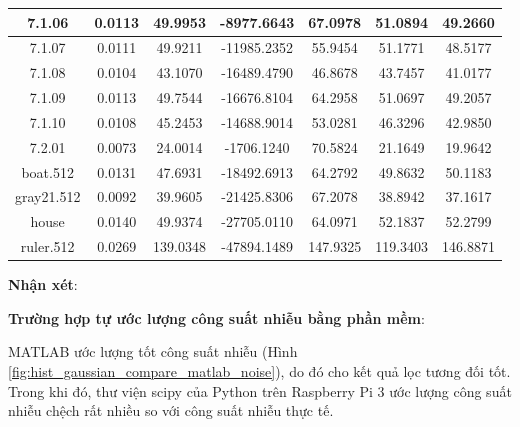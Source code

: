\begin{table}[H]
\begin{tabular}{|c|cccc|cc|}
7.1.06 & \multicolumn{1}{c|}{0.0113} & \multicolumn{1}{c|}{49.9953} & \multicolumn{1}{c|}{-8977.6643} & 67.0978 & \multicolumn{1}{c|}{51.0894} & 49.2660 \\ \hline
7.1.07 & \multicolumn{1}{c|}{0.0111} & \multicolumn{1}{c|}{49.9211} & \multicolumn{1}{c|}{-11985.2352} & 55.9454 & \multicolumn{1}{c|}{51.1771} & 48.5177 \\ \hline
7.1.08 & \multicolumn{1}{c|}{0.0104} & \multicolumn{1}{c|}{43.1070} & \multicolumn{1}{c|}{-16489.4790} & 46.8678 & \multicolumn{1}{c|}{43.7457} & 41.0177 \\ \hline
7.1.09 & \multicolumn{1}{c|}{0.0113} & \multicolumn{1}{c|}{49.7544} & \multicolumn{1}{c|}{-16676.8104} & 64.2958 & \multicolumn{1}{c|}{51.0697} & 49.2057 \\ \hline
7.1.10 & \multicolumn{1}{c|}{0.0108} & \multicolumn{1}{c|}{45.2453} & \multicolumn{1}{c|}{-14688.9014} & 53.0281 & \multicolumn{1}{c|}{46.3296} & 42.9850 \\ \hline
7.2.01 & \multicolumn{1}{c|}{0.0073} & \multicolumn{1}{c|}{24.0014} & \multicolumn{1}{c|}{-1706.1240} & 70.5824 & \multicolumn{1}{c|}{21.1649} & 19.9642 \\ \hline
boat.512 & \multicolumn{1}{c|}{0.0131} & \multicolumn{1}{c|}{47.6931} & \multicolumn{1}{c|}{-18492.6913} & 64.2792 & \multicolumn{1}{c|}{49.8632} & 50.1183 \\ \hline
gray21.512 & \multicolumn{1}{c|}{0.0092} & \multicolumn{1}{c|}{39.9605} & \multicolumn{1}{c|}{-21425.8306} & 67.2078 & \multicolumn{1}{c|}{38.8942} & 37.1617 \\ \hline
house & \multicolumn{1}{c|}{0.0140} & \multicolumn{1}{c|}{49.9374} & \multicolumn{1}{c|}{-27705.0110} & 64.0971 & \multicolumn{1}{c|}{52.1837} & 52.2799 \\ \hline
ruler.512 & \multicolumn{1}{c|}{0.0269} & \multicolumn{1}{c|}{139.0348} & \multicolumn{1}{c|}{-47894.1489} & 147.9325 & \multicolumn{1}{c|}{119.3403} & 146.8871 \\ \hline
\end{tabular}
\end{table}

\textbf{Nhận xét}: 

\begin{center}
    \textbf{Trường hợp tự ước lượng công suất nhiễu bằng phần mềm}:
\end{center}

MATLAB ước lượng tốt công suất nhiễu (Hình \ref{fig:hist_gaussian_compare_matlab_noise}), 
do đó cho kết quả lọc tương đối tốt.
Trong khi đó, thư viện scipy của Python trên Raspberry Pi 3 ước lượng công suất nhiễu chệch rất nhiều so với công suất nhiễu thực tế.

